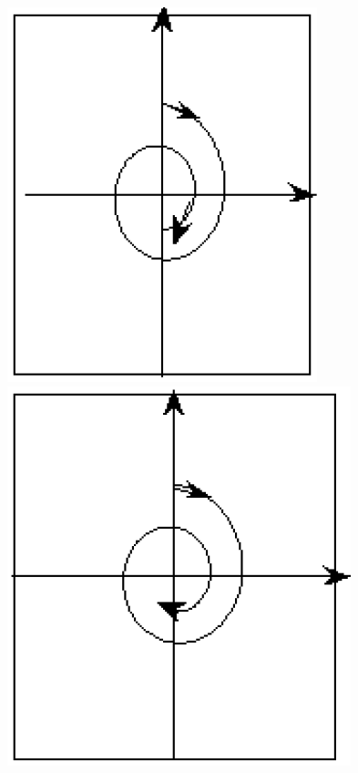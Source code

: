 	\begin{figure}[H]
		\centering
		\begin{minipage}{0.18\textwidth}
			\includegraphics[width=\textwidth]{img/10_04}
			\par
		\end{minipage}
		\begin{minipage}{0.2\textwidth}
			\includegraphics[width=\textwidth]{img/10_05}

\end{minipage}
\end{figure}
